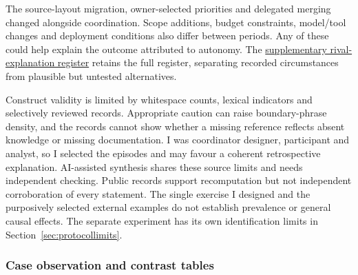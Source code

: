 The source-layout migration, owner-selected priorities and delegated merging
changed alongside coordination. Scope additions, budget constraints, model/tool
changes and deployment conditions also differ between periods. Any of these
could help explain the outcome attributed to autonomy. The
\hyperref[sec:supplement]{supplementary rival-explanation register} retains the full
register, separating recorded circumstances from plausible but untested
alternatives.

Construct validity is limited by whitespace counts, lexical indicators and
selectively reviewed records. Appropriate caution can raise boundary-phrase
density, and the records cannot show whether a missing reference reflects
absent knowledge or missing documentation. I was coordinator designer,
participant and analyst, so I selected the episodes and may favour a coherent
retrospective explanation. AI-assisted synthesis shares these source limits
and needs independent checking.
Public records support recomputation but not independent corroboration of
every statement. The single exercise I designed and the purposively selected
external examples do not establish prevalence or general causal effects.
The separate experiment has its own identification limits in
Section~\ref{sec:protocollimits}.


\subsubsection{Case observation and contrast tables}

